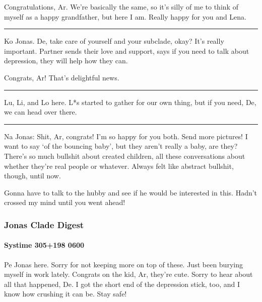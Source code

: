 Congratulations, Ar. We're basically the same, so it's silly of me to think of myself as a happy grandfather, but here I am. Really happy for you and Lena.

\begin{center}\rule{0.5\linewidth}{\linethickness}\end{center}

Ko Jonas. De, take care of yourself and your subclade, okay? It's really important. Partner sends their love and support, says if you need to talk about depression, they will help how they can.

Congrats, Ar! That's delightful news.

\begin{center}\rule{0.5\linewidth}{\linethickness}\end{center}

Lu, Li, and Lo here. L*s started to gather for our own thing, but if you need, De, we can head over there.

\begin{center}\rule{0.5\linewidth}{\linethickness}\end{center}

Na Jonas: Shit, Ar, congrats! I'm so happy for you both. Send more pictures! I want to say `of the bouncing baby', but they aren't really a baby, are they? There's so much bullshit about created children, all these conversations about whether they're real people or whatever. Always felt like abstract bullshit, though, until now.

Gonna have to talk to the hubby and see if he would be interested in this. Hadn't crossed my mind until you went ahead!

\hypertarget{jonas-clade-digest-3}{%
\subsubsection{Jonas Clade Digest}\label{jonas-clade-digest-3}}

\hypertarget{systime-305198-0600}{%
\paragraph{Systime 305+198 0600}\label{systime-305198-0600}}

Pe Jonas here. Sorry for not keeping more on top of these. Just been burying myself in work lately. Congrats on the kid, Ar, they're cute. Sorry to hear about all that happened, De. I got the short end of the depression stick, too, and I know how crushing it can be. Stay safe!

